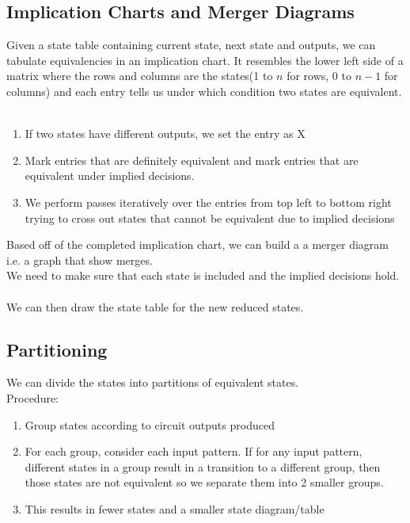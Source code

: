\documentclass[12pt]{report}
\begin{document}
		\subsection{Implication Charts and Merger Diagrams}
			Given a state table containing current state, next state and outputs, we can tabulate equivalencies in an implication chart. It resembles the lower left side of a matrix where the rows and columns are the states(1 to $n$ for rows, 0 to $n-1$ for columns) and each entry tells us under which condition two states are equivalent. \\
			\\
			\begin{enumerate}
				\item If two states have different outputs, we set the entry as X
				\item Mark entries that are definitely equivalent and mark entries that are equivalent under implied decisions.
				\item We perform passes iteratively over the entries from top left to bottom right trying to cross out states that cannot be equivalent due to implied decisions
			\end{enumerate}
			Based off of the completed implication chart, we can build a  a merger diagram i.e. a graph that show merges.\\
			We need to make sure that each state is included and the implied decisions hold.\\
			\\
			We can then draw the state table for the new reduced states.
		\subsection{Partitioning}
			We can divide the states into partitions of equivalent states. \\
			Procedure:\\
			\begin{enumerate}
				\item Group states according to circuit outputs produced
				\item For each group, consider each input pattern. If for any input pattern, different states in a group result in a transition to a different group, then those states are not equivalent so we separate them into 2 smaller groups.
				\item This results in fewer states and a smaller state diagram/table				
			\end{enumerate}
\end{document}
